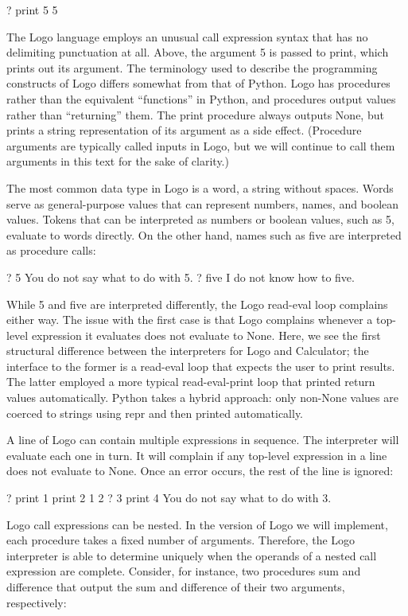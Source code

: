 \documentclass[letterpaper,10pt,dvipdfmx]{sphinxmanual}
\begin{document}
? print 5
5

The Logo language employs an unusual call expression syntax that has no delimiting punctuation at all. Above, the argument 5 is passed to print, which prints out its argument. The terminology used to describe the programming constructs of Logo differs somewhat from that of Python. Logo has procedures rather than the equivalent ``functions'' in Python, and procedures output values rather than ``returning'' them. The print procedure always outputs None, but prints a string representation of its argument as a side effect. (Procedure arguments are typically called inputs in Logo, but we will continue to call them arguments in this text for the sake of clarity.)

The most common data type in Logo is a word, a string without spaces. Words serve as general-purpose values that can represent numbers, names, and boolean values. Tokens that can be interpreted as numbers or boolean values, such as 5, evaluate to words directly. On the other hand, names such as five are interpreted as procedure calls:

? 5
You do not say what to do with 5.
? five
I do not know how to five.

While 5 and five are interpreted differently, the Logo read-eval loop complains either way. The issue with the first case is that Logo complains whenever a top-level expression it evaluates does not evaluate to None. Here, we see the first structural difference between the interpreters for Logo and Calculator; the interface to the former is a read-eval loop that expects the user to print results. The latter employed a more typical read-eval-print loop that printed return values automatically. Python takes a hybrid approach: only non-None values are coerced to strings using repr and then printed automatically.

A line of Logo can contain multiple expressions in sequence. The interpreter will evaluate each one in turn. It will complain if any top-level expression in a line does not evaluate to None. Once an error occurs, the rest of the line is ignored:

? print 1 print 2
1
2
? 3 print 4
You do not say what to do with 3.

Logo call expressions can be nested. In the version of Logo we will implement, each procedure takes a fixed number of arguments. Therefore, the Logo interpreter is able to determine uniquely when the operands of a nested call expression are complete. Consider, for instance, two procedures sum and difference that output the sum and difference of their two arguments, respectively:
\end{document}
